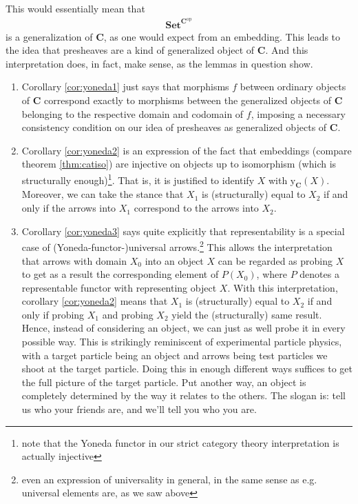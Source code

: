 This would essentially mean that
\begin{align*}
  \mathbf{Set}^{\mathbf{C}^{\mathrm{op}}}
\end{align*}
is a generalization of $\mathbf{C}$, as one would expect from an embedding.
This leads to the idea that presheaves are a kind of {\glqq}generalized object of $\mathbf{C}${\grqq}.
And this interpretation does, in fact, make sense, as the lemmas in question show.
\begin{enumerate}
\item[(1)]
Corollary \ref{cor:yoneda1} just says that morphisms $f$ between {\glqq}ordinary objects of $\mathbf{C}${\grqq} correspond exactly to morphisms between the {\glqq}generalized objects of $\mathbf{C}${\grqq} belonging to the respective domain and codomain of $f$, imposing a necessary consistency condition on our idea of presheaves as {\glqq}generalized objects of $\mathbf{C}${\grqq}.
\item[(2)]
Corollary \ref{cor:yoneda2} is an expression of the fact that embeddings (compare theorem \ref{thm:catiso}) are injective on objects up to isomorphism (which is structurally enough)\footnote{note that the Yoneda functor in our strict category theory interpretation is actually injective}.
That is, it is justified to identify $X$ with $\mathrm{y}_{\mathbf{C}}(X)$.
Moreover, we can take the stance that $X_{1}$ is (structurally) equal to $X_{2}$ if and only if the arrows into $X_{1}$ correspond to the arrows into $X_{2}$.
\item[(3)]
Corollary \ref{cor:yoneda3} says quite explicitly that representability is a special case of (Yoneda-functor-)universal arrows.\footnote{even an expression of universality in general, in the same sense as e.g. universal elements are, as we saw above} This allows the interpretation that arrows with domain $X_{0}$ into an object $X$ can be regarded as probing $X$ to get as a result the corresponding element of $P(X_{0})$, where $P$ denotes a representable functor with representing object $X$.
With this interpretation, corollary \ref{cor:yoneda2} means that $X_{1}$ is (structurally) equal to $X_{2}$ if and only if probing $X_{1}$ and probing $X_{2}$ yield the (structurally) same result.
Hence, instead of considering an object, we can just as well probe it in every possible way.
This is strikingly reminiscent of experimental particle physics, with a target particle being an object and arrows being test particles we shoot at the target particle.
Doing this in enough different ways suffices to get the full picture of the target particle.
Put another way, an object is completely determined by the way it relates to the others.
The slogan is: tell us who your friends are, and we'll tell you who you are.
\end{enumerate}
